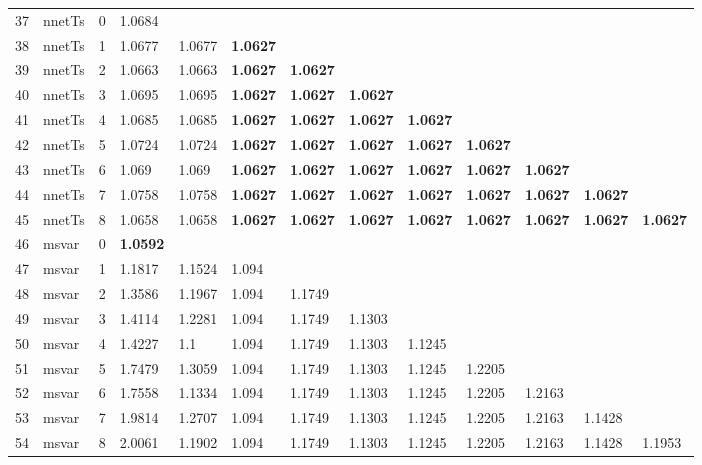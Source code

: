 \documentclass[10pt,a4paper]{article}
\begin{document}
\begin{table}[ht]
\begin{tabular}{rlrllllllllll}
   \hline
37 & nnetTs &     0 & 1.0684 &  &  &  &  &  &  &  &  &  \\ 
  38 & nnetTs &     1 & 1.0677 & 1.0677 & \textbf{1.0627} &  &  &  &  &  &  &  \\ 
  39 & nnetTs &     2 & 1.0663 & 1.0663 & \textbf{1.0627} & \textbf{1.0627} &  &  &  &  &  &  \\ 
  40 & nnetTs &     3 & 1.0695 & 1.0695 & \textbf{1.0627} & \textbf{1.0627} & \textbf{1.0627} &  &  &  &  &  \\ 
  41 & nnetTs &     4 & 1.0685 & 1.0685 & \textbf{1.0627} & \textbf{1.0627} & \textbf{1.0627} & \textbf{1.0627} &  &  &  &  \\ 
  42 & nnetTs &     5 & 1.0724 & 1.0724 & \textbf{1.0627} & \textbf{1.0627} & \textbf{1.0627} & \textbf{1.0627} & \textbf{1.0627} &  &  &  \\ 
  43 & nnetTs &     6 & 1.069 & 1.069 & \textbf{1.0627} & \textbf{1.0627} & \textbf{1.0627} & \textbf{1.0627} & \textbf{1.0627} & \textbf{1.0627} &  &  \\ 
  44 & nnetTs &     7 & 1.0758 & 1.0758 & \textbf{1.0627} & \textbf{1.0627} & \textbf{1.0627} & \textbf{1.0627} & \textbf{1.0627} & \textbf{1.0627} & \textbf{1.0627} &  \\ 
  45 & nnetTs &     8 & 1.0658 & 1.0658 & \textbf{1.0627} & \textbf{1.0627} & \textbf{1.0627} & \textbf{1.0627} & \textbf{1.0627} & \textbf{1.0627} & \textbf{1.0627} & \textbf{1.0627} \\ 
   \hline
46 & msvar &     0 & \textbf{1.0592} &  &  &  &  &  &  &  &  &  \\ 
  47 & msvar &     1 & 1.1817 & 1.1524 & 1.094 &  &  &  &  &  &  &  \\ 
  48 & msvar &     2 & 1.3586 & 1.1967 & 1.094 & 1.1749 &  &  &  &  &  &  \\ 
  49 & msvar &     3 & 1.4114 & 1.2281 & 1.094 & 1.1749 & 1.1303 &  &  &  &  &  \\ 
  50 & msvar &     4 & 1.4227 & 1.1 & 1.094 & 1.1749 & 1.1303 & 1.1245 &  &  &  &  \\ 
  51 & msvar &     5 & 1.7479 & 1.3059 & 1.094 & 1.1749 & 1.1303 & 1.1245 & 1.2205 &  &  &  \\ 
  52 & msvar &     6 & 1.7558 & 1.1334 & 1.094 & 1.1749 & 1.1303 & 1.1245 & 1.2205 & 1.2163 &  &  \\ 
  53 & msvar &     7 & 1.9814 & 1.2707 & 1.094 & 1.1749 & 1.1303 & 1.1245 & 1.2205 & 1.2163 & 1.1428 &  \\ 
  54 & msvar &     8 & 2.0061 & 1.1902 & 1.094 & 1.1749 & 1.1303 & 1.1245 & 1.2205 & 1.2163 & 1.1428 & 1.1953 \\ 

\end{tabular}
\end{table}
\end{document}

